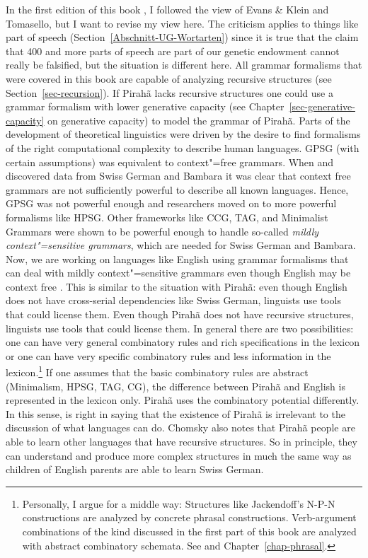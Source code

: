 In the first edition of this book \citep{MuellerGT-Eng1}, I followed the view of Evans \& Klein and
Tomasello, but I want to revise my view here. The criticism applies to things like part of speech
(Section~\ref{Abschnitt-UG-Wortarten}) since it is true that the claim that 400 and more parts of
speech are part of our genetic endowment \citep[, 57]{CR2010a} cannot really be falsified,
but the situation is different here. All grammar formalisms that were covered in this book are
capable of analyzing recursive structures (see Section~\ref{sec-recursion}). If Pirahã lacks recursive
structures one could use a grammar formalism with lower generative capacity (see
Chapter~\ref{sec-generative-capacity} on generative capacity) to model the grammar of Pirahã. Parts
of the development of theoretical linguistics were driven by the desire to find formalisms of the
right computational complexity to describe human languages. GPSG (with certain assumptions) was
equivalent to context"=free\label{page-GPSG-context-free} grammars. When \citet{Shieber85a} and \citet{Culy85a} discovered
data from Swiss German and Bambara it was clear that context free
grammars are not sufficiently powerful to describe all known languages. Hence, GPSG was not powerful
enough and researchers moved on to more powerful formalisms like HPSG. Other frameworks like CCG,
TAG, and Minimalist Grammars were shown to be powerful enough to handle so-called \emph{mildly
  context"=sensitive grammars}, which are needed for Swiss German and Bambara. Now, we are working on languages
like English using grammar formalisms that can deal with mildly context"=sensitive grammars even though English may be
context free \citep{PR2007a}. This is similar to the situation with Pirahã: even though English
does not have cross-serial dependencies like Swiss German, linguists use tools that could license
them. Even though Pirahã does not have recursive structures, linguists use tools that could license
them. In general there are two possibilities: one can have very general combinatory rules and rich
specifications in the lexicon or one can have very specific combinatory rules and less information
in the lexicon.\footnote{%
  Personally, I argue for a middle way: Structures like Jackendoff's N-P-N constructions \citeyearpar{Jackendoff2008a} are
  analyzed by concrete phrasal constructions. Verb-argument combinations of the kind discussed in
  the first part of this book are analyzed with abstract combinatory schemata. See
   and Chapter~\ref{chap-phrasal}.
}
If one assumes that the basic combinatory rules are abstract (Minimalism, HPSG, TAG, CG), the
difference between Pirahã and English is represented in the lexicon only. Pirahã uses the
combinatory potential differently. In this sense, \citet{Chomsky2014a} is right in saying that the
existence of Pirahã is irrelevant to the discussion of what languages can do. Chomsky also notes
that Pirahã people are able to learn other languages that have recursive structures. So in
principle, they can understand and produce more complex structures in much the same way as children
of English parents are able to learn Swiss German.

